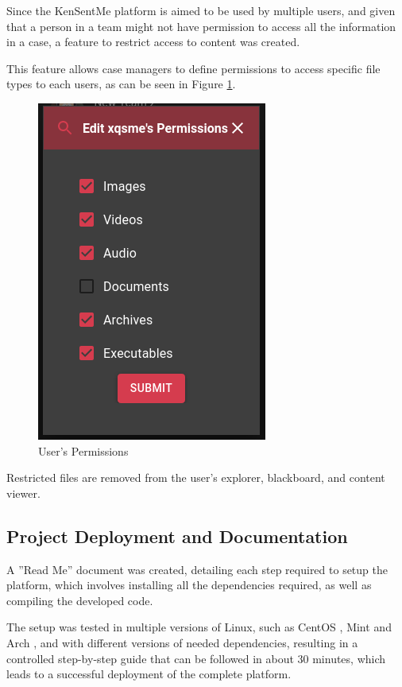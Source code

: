 Since the KenSentMe platform is aimed to be used by multiple users, and given that a person in a team might not have permission to access all the information in a case, a feature to restrict access to content was created.

This feature allows case managers to define permissions to access specific file types to each users, as can be seen in Figure \ref{fig:permissions}.

\begin{figure}[ht]
 \centering
 \includegraphics[width=0.5\linewidth]{imgs/permissions.png}
 \caption{User's Permissions}
 \label{fig:permissions}
\end{figure}

Restricted files are removed from the user's explorer, blackboard, and content viewer.

\subsection{Project Deployment and Documentation}

A ''Read Me'' document was created, detailing each step required to setup the platform, which involves installing all the dependencies required, as well as compiling the developed code.

The setup was tested in multiple versions of Linux,  such as CentOS \cite{centos}, Mint \cite{mint} and Arch \cite{arch}, and with different versions of needed dependencies, 
resulting in a controlled step-by-step guide that can be followed in about 30 minutes, which leads to a successful deployment of the complete platform.

